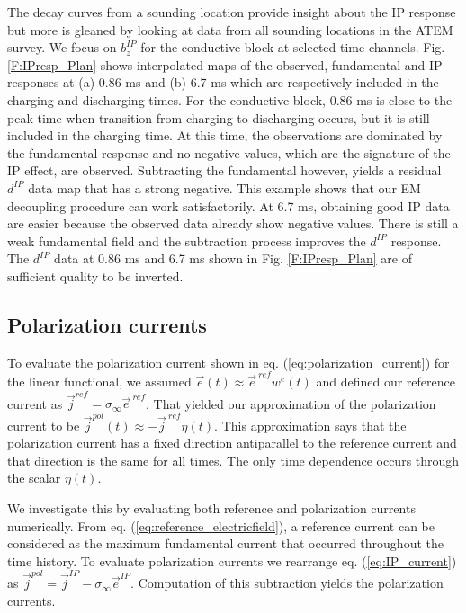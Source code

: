 \documentclass[extra,mreferee]{gji}
\newcommand{\siginf}{\sigma_\infty}
\renewcommand {\j}  { {\vec j} }
\newcommand {\e}  { {\vec e} }
\newcommand{\peta}{\tilde{\eta}}
\newcommand{\eref}{\e^{\ ref}}
\newcommand{\dip}{d^{IP}}
\begin{document}
The decay curves from a sounding location  provide insight about the IP response but more is gleaned by looking at data from all  sounding locations in the ATEM survey. We focus on $b_z^{IP}$ for the conductive block at selected time channels. Fig. \ref{F:IPresp_Plan} shows interpolated maps of the observed, fundamental and IP responses at (a) 0.86 ms and (b) 6.7 ms which are respectively included in the charging and discharging times. For the conductive block, 0.86 ms is close to the peak time when transition from charging to discharging occurs, but it is still included in the charging time. 
At this time, the observations are dominated by the fundamental response and no negative values,  which are the signature of the IP effect, are observed. Subtracting the fundamental however, yields a residual $\dip$ data map that has a strong negative. This  example  shows that our EM decoupling procedure can  work satisfactorily.  At 6.7 ms, obtaining good IP data are easier because the observed data already show negative values. There is still a weak fundamental field and the subtraction process improves the $\dip$ response. The $\dip$ data at  0.86 ms and 6.7 ms shown in Fig. \ref{F:IPresp_Plan} are of sufficient quality to be inverted. 


\subsection{Polarization currents}

To evaluate the polarization current shown in eq. (\ref{eq:polarization_current}) for the linear functional, we assumed $\e(t) \approx \eref w^e(t)$ and defined our reference current as $\j^{ref}=\siginf \eref$. That yielded our approximation of the polarization current to be $\j^{pol}(t) \approx -\j^{\ ref} \peta(t)$. This approximation says that the polarization current has a fixed direction antiparallel to the reference current and that direction is the same for all times. The only time dependence occurs through the scalar $\peta(t)$. 


We investigate this by evaluating both reference and polarization currents numerically. 
From eq. (\ref{eq:reference_electricfield}), a reference current can be considered as the maximum fundamental current that occurred throughout the  time history. 
To evaluate polarization currents we rearrange eq. (\ref{eq:IP_current}) as $\j^{pol} = \j^{IP} - \siginf\e^{IP}$. Computation of this subtraction yields the polarization currents. 
\end{document}
